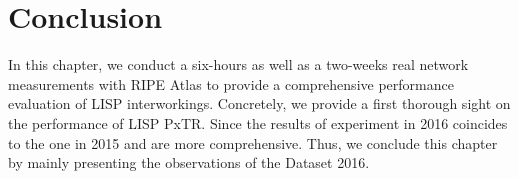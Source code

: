 \section{Conclusion}
\label{sec:pxtr_conclusion}
In this chapter, we conduct a six-hours as well as a two-weeks real network measurements with RIPE Atlas to provide a comprehensive performance evaluation of LISP interworkings. Concretely, we provide a first thorough sight on the performance of LISP PxTR. Since the results of experiment in 2016 coincides to the one in 2015 and are more comprehensive. Thus, we conclude this chapter by mainly presenting the observations of the Dataset 2016. 

